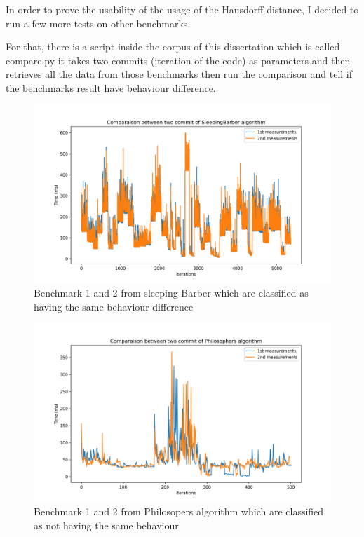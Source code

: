 \documentclass{article}
\begin{document}
In order to prove the usability of the usage of the Hausdorff distance, I decided to run a few more tests on other benchmarks.

For that, there is a script inside the corpus of this dissertation which is called compare.py it takes two commits (iteration of the code) as parameters and then retrieves all the data from those benchmarks then run the comparison and tell if the benchmarks result have behaviour difference. \\

\begin{figure}[]
    \centering
    \includegraphics[width=1\textwidth]{images/plot_SleepingBarber_4.069999999999936.png}
    \caption{Benchmark 1 and 2 from sleeping Barber which are classified as having the same behaviour difference}
    \label{fig:bench_1_2_1}
\end{figure}

\begin{figure}[]
    \centering
    \includegraphics[width=1\textwidth]{images/plot_Philosophers_42.533000000000015.png}
    \caption{Benchmark 1 and 2 from Philosopers algorithm which are classified as not having the same behaviour}
    \label{fig:bench_1_2_2}
\end{figure}
\end{document}
